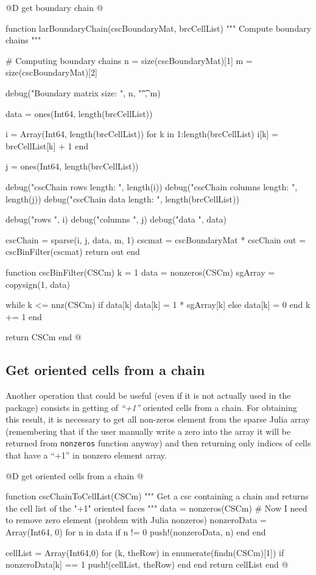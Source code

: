 \documentclass[11pt,oneside]{article}	%
\begin{document}
@D get boundary chain
@{function larBoundaryChain(cscBoundaryMat, brcCellList)
  """
  Compute boundary chains
  """

  # Computing boundary chains
  n = size(cscBoundaryMat)[1]
  m = size(cscBoundaryMat)[2]

  debug("Boundary matrix size: ", n, "\t", m)

  data = ones(Int64, length(brcCellList))

  i = Array(Int64, length(brcCellList))
  for k in 1:length(brcCellList)
    i[k] = brcCellList[k] + 1
  end

  j = ones(Int64, length(brcCellList))

  debug("cscChain rows length: ", length(i))
  debug("cscChain columns length: ", length(j))
  debug("cscChain data length: ", length(brcCellList))

  debug("rows ", i)
  debug("columns ", j)
  debug("data ", data)

  cscChain = sparse(i, j, data, m, 1)
  cscmat = cscBoundaryMat * cscChain
  out = cscBinFilter(cscmat)
  return out
end

function cscBinFilter(CSCm)
  k = 1
  data = nonzeros(CSCm)
  sgArray = copysign(1, data)

  while k <= nnz(CSCm)
    if data[k] %
      data[k] = 1 * sgArray[k]
    else
      data[k] = 0
    end
    k += 1
  end

  return CSCm
end
@}

\subsection{Get oriented cells from a chain}\label{sec:getCellsFromChain}

Another operation that could be useful (even if it is not actually used in the package) consists in getting of \textit{``+1''} oriented cells from a chain. For obtaining this result, it is necessary to get all non-zeros element from the sparse Julia array (remembering that if the user manually write a zero into the array it will be returned from \texttt{nonzeros} function anyway) and then returning only indices of cells that have a ``+1'' in nonzero element array.

@D get oriented cells from a chain
@{function cscChainToCellList(CSCm)
  """
  Get a csc containing a chain and returns
  the cell list of the "+1" oriented faces
  """
  data = nonzeros(CSCm)
  # Now I need to remove zero element (problem with Julia nonzeros)
  nonzeroData = Array(Int64, 0)
  for n in data
    if n != 0
      push!(nonzeroData, n)
    end
  end

  cellList = Array(Int64,0)
  for (k, theRow) in enumerate(findn(CSCm)[1])
    if nonzeroData[k] == 1
      push!(cellList, theRow)
    end
  end
  return cellList
end @}
\end{document}
